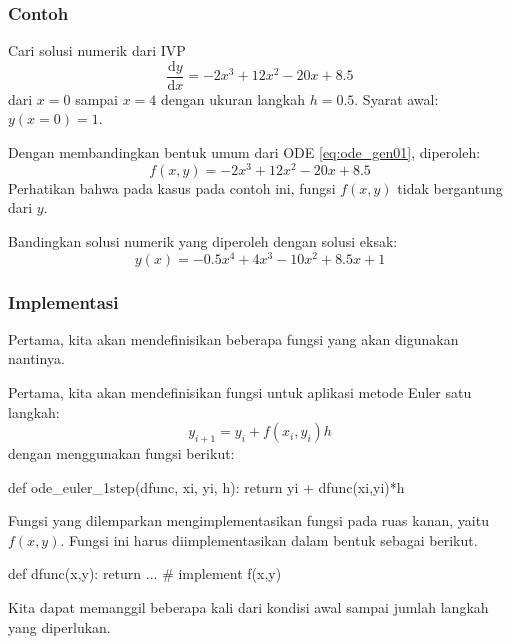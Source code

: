 
\begin{frame}
\frametitle{Contoh}
Cari solusi numerik dari IVP
\begin{equation*}
\frac{\mathrm{d}y}{\mathrm{d}x} = -2x^3 + 12x^2 - 20x + 8.5
\end{equation*}
dari $x = 0$ sampai $x = 4$ dengan ukuran langkah $h=0.5$.
Syarat awal: $y(x=0) = 1$.

Dengan membandingkan bentuk umum dari ODE \eqref{eq:ode_gen01}, diperoleh:
\begin{equation*}
f(x,y) = -2x^3 + 12x^2 - 20x + 8.5
\end{equation*}
Perhatikan bahwa pada kasus pada contoh ini, fungsi $f(x,y)$
tidak bergantung dari $y$.

Bandingkan solusi numerik yang diperoleh dengan solusi eksak:
\begin{equation*}
y(x) = -0.5x^4 + 4x^3 - 10x^2 + 8.5x + 1
\end{equation*}

\end{frame}



\begin{frame}[fragile]
\frametitle{Implementasi}

Pertama, kita akan mendefinisikan beberapa fungsi yang akan digunakan nantinya.

Pertama, kita akan mendefinisikan fungsi untuk aplikasi metode Euler satu langkah:
\begin{equation*}
y_{i+1} = y_{i} + f(x_i, y_i) h
\end{equation*}
dengan menggunakan fungsi berikut:
\begin{pythoncode}
def ode_euler_1step(dfunc, xi, yi, h):
    return yi + dfunc(xi,yi)*h
\end{pythoncode}

Fungsi yang dilemparkan  mengimplementasikan fungsi pada ruas kanan,
yaitu $f(x,y)$. Fungsi ini harus diimplementasikan dalam bentuk sebagai berikut.
\begin{pythoncode}
def dfunc(x,y):
    return ... # implement f(x,y)
\end{pythoncode}

Kita dapat memanggil  beberapa kali dari kondisi awal
sampai jumlah langkah yang diperlukan.

\end{frame}



